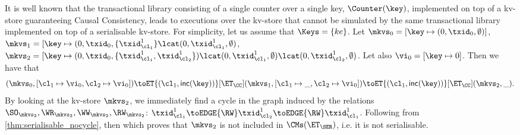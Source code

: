 It is well known that the transactional library consisting of a single counter over a single 
key, $\Counter(\key)$, implemented on top of a kv-store guaranteeing Causal Consistency, 
leads to executions over the kv-store that cannot be simulated by the same transactional 
library implemented on top of a serialisable kv-store. 
For simplicity, let us assume that $\Keys = \{ke\}$.
Let $\mkvs_{0} = [\key \mapsto (0, \txid_{0}, \emptyset)]$,  
$\mkvs_1 = [\key \mapsto (0, \txid_{0}, \{\txid_{\cl_1}^{1}\} \lcat (0, \txid_{\cl_1}^{1}, \emptyset)$, 
$\mkvs_2 = [\key \mapsto (0, \txid_{0}, \{\txid_{\cl_1}^{1}, \txid_{\cl_2}^{1}\}) \lcat (0, \txid_{\cl_1}^{1}, \emptyset) 
\lcat (0, \txid_{\cl_2}^{1}, \emptyset)$. Let also
$\vi_{0} = [\key \mapsto {0}]$. Then we have that 
\[
    (\mkvs_{0}, [\cl_1 \mapsto \vi_0, \cl_2 \mapsto \vi_0]) \toET{(\cl_1, \mathsf{inc(\key)})}[\ET_{\CC}]
    (\mkvs_1, [\cl_1 \mapsto \_, \cl_2 \mapsto \vi_0]) \toET{(\cl_1, \mathsf{inc(\key)})}[\ET_{\CC}]
(\mkvs_2, \_).
\]
By looking at the kv-store $\mkvs_{2}$, we immediately find a cycle in the graph induced by 
the relations $\SO_{\mkvs_{2}}, \WR_{\mkvs_{2}}, \WW_{\mkvs_{2}}, \RW_{\mkvs_{2}}$: 
$\txid_{\cl_1}^{1} \toEDGE{\RW} \txid_{\cl_2}^{1} \toEDGE{\RW} \txid_{\cl_1}^{1}$. 
Following from \cref{thm:serialisable_nocycle}, then 
which proves that $\mkvs_2$ is not included in $\CMs(\ET_{\SER})$, i.e. it is 
not serialisable.

